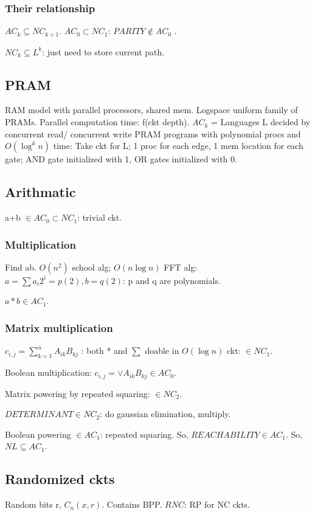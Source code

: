 \documentclass[oneside, article]{memoir}
\begin{document}
\subsubsection{Their relationship}
$AC_{k} \subseteq NC_{k+1}$. $AC_{0} \subset NC_{1}$: $PARITY \notin AC_{0}$ \why.

$NC_{k} \subseteq L^{k}$: just need to store current path.

\subsection{PRAM}
RAM model with parallel processors, shared mem. Logspace uniform family of PRAMs. Parallel computation time: f(ckt depth). $AC_{k}$ = Languages L decided by concurrent read/ concurrent write PRAM programs with polynomial procs and $O(\log^{k}n)$ time: Take ckt for L; 1 proc for each edge, 1 mem location for each gate; AND gate initialized with 1, OR gates initialized with 0.

\subsection{Arithmatic}
a+b $\in AC_{0} \subset NC_{1}$: trivial ckt.

\subsubsection{Multiplication}
Find ab. $O(n^{2})$ school alg; $O(n\log n)$ FFT alg: \\
$a = \sum a_{i}2^{i} = p(2), b = q(2)$: p and q are polynomials.

$a*b \in AC_{1}$.

\subsubsection{Matrix multiplication}
$c_{i,j} = \sum_{k=1}^{n} A_{ik}B_{kj}$ : both * and $\sum$ doable in $O(\log n)$ ckt: $\in NC_{1}$.

Boolean multiplication: $c_{i,j} = \lor A_{ik}B_{kj} \in AC_{0}$.

Matrix powering by repeated squaring: $\in NC_{2}$.

$DETERMINANT \in NC_{2}$: do gaussian elimination, multiply.

Boolean powering $\in AC_{1}$: repeated squaring. So, $REACHABILITY \in AC_{1}$. So, $NL \subseteq AC_{1}$.

\subsection{Randomized ckts}
Random bits r, $C_{n}(x, r)$. Contains BPP. $RNC$: RP for NC ckts.
\end{document}
